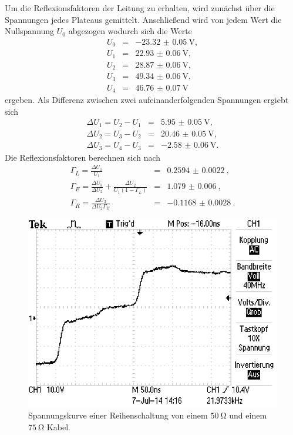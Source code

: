 Um die Reflexionsfaktoren der Leitung zu erhalten, wird zunächst über die Spannungen jedes Plateaus gemittelt.
Anschließend wird von jedem Wert die Nullspannung $U_0$ abgezogen wodurch sich die Werte
\begin{eqnarray*}
	U_0 &=& \SI{-23.32(5)}{\volt},\\
	U_1 &=& \SI{22.93(6)}{\volt},\\
	U_2 &=& \SI{28.87(6)}{\volt},\\
	U_3 &=& \SI{49.34(6)}{\volt},\\
	U_4 &=& \SI{46.76(7)}{\volt}
\end{eqnarray*}
ergeben.
Als Differenz zwischen zwei aufeinanderfolgenden Spannungen ergiebt sich
\begin{eqnarray*}
	\Delta U_1 = U_2 - U_1 &=& \SI{5.95(5)}{\volt},\\
	\Delta U_2 = U_3 - U_2 &=& \SI{20.46(5)}{\volt},\\
	\Delta U_3 = U_4 - U_3 &=& \SI{-2.58(6)}{\volt}.
\end{eqnarray*}
Die Reflexionsfaktoren berechnen sich nach
\begin{eqnarray*}
	\Gamma_L = \frac{\Delta U_1}{U_1} &=& \SI{0.2594(22)}{},\\
	\Gamma_E = \frac{\Delta U_3}{\Delta U_2} + \frac{\Delta U_2}{U_1(1-\Gamma_L)} &=& \SI{1.079(6)}{},\\
	\Gamma_R = \frac{\Delta U_3}{\Delta U_2 \Gamma_E} &=& \SI{-0.1168(28)}{}.
\end{eqnarray*}

\begin{figure}
	\centering
	\includegraphics[width = 12cm]{data/e/ALL0008/F0008TEK.JPG}
	\caption{Spannungskurve einer Reihenschaltung von einem $\SI{50}{\ohm}$ und einem $\SI{75}{\ohm}$ Kabel.}
	\label{fig_abs10}
\end{figure}


